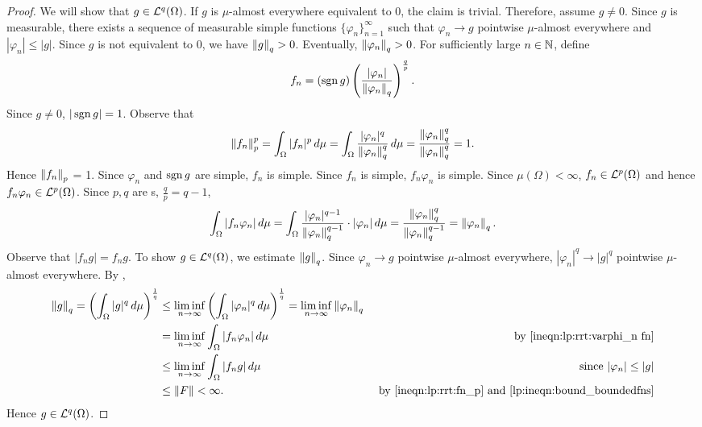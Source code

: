 \begin{proof}
We will show that $g \in {\mathcal {L}^q}(\Omega)$. If $g$ is $\mu$-almost everywhere equivalent to $0$, the claim is trivial. Therefore, assume $g \neq 0$. Since $g$ is measurable, there exists a sequence of measurable simple functions $\{ \varphi_n \}_{n = 1}^{\infty}$ such that $\varphi_n \rightarrow g$ pointwise $\mu$-almost everywhere and $| \varphi_n | \leq |g|$. Since $g$ is not equivalent to $0$, we have $\left\lVert g\right\rVert_q > 0$. Eventually, $\left\lVert \varphi_n\right\rVert_q > 0$. For sufficiently large $n \in {\mathbb N}$, define
\begin{align*}
    f_n = (\operatorname*{sgn} g) \left ( \frac{|\varphi_n|}{\left\lVert\varphi_n\right\rVert_q} \right)^{\frac{q}{p}}.
\end{align*}
Since $g \neq 0$, $| \operatorname*{sgn} g | = 1$. Observe that 
\begin{align}
     \label{ineqn:lp:rrt:fn_p}
    \left\lVert f_n\right\rVert_p^p = \int_\Omega |f_n|^p  \,d\mu = \int_\Omega \frac{|\varphi_n|^q}{\left\lVert\varphi_n\right\rVert_q^q} \,d\mu = \frac{\left\lVert\varphi_n\right\rVert_q^q}{\left\lVert\varphi_n\right\rVert_q^q} = 1.
\end{align}
Hence $\left\lVert f_n\right\rVert_p$ = 1. Since $\varphi_n$ and $\operatorname*{sgn} g$ are simple, $f_n$ is simple. Since $f_n$ is simple, $f_n \varphi_n$ is simple. Since $\mu(\Omega) < \infty$, $f_n \in {\mathcal {L}^p}(\Omega)$ and hence $f_n \varphi_n \in {\mathcal {L}^p}(\Omega)$.
Since $p, q$ are s, $\frac{q}{p} = q - 1$,
\begin{equation}
    \label{ineqn:lp:rrt:varphi_n fn}
    \int_\Omega | f_n \varphi_n | \,d\mu  = \int_\Omega \frac{|\varphi_n|^{q-1}}{\left\lVert\varphi_n\right\rVert_q^{q - 1}} \cdot |\varphi_n | \,d\mu = \frac{\left\lVert\varphi_n\right\rVert_q^{q}}{\left\lVert\varphi_n\right\rVert_q^{q - 1}} = \left\lVert\varphi_n\right\rVert_q. 
\end{equation}
Observe that $|f_n g| = f_n g$.
To show $g \in {\mathcal {L}^q}(\Omega)$, we estimate $\left\lVert g\right\rVert_q$. Since $\varphi_n \rightarrow g$ pointwise $\mu$-almost everywhere, $|\varphi_n|^q \rightarrow |g|^q$ pointwise $\mu$-almost everywhere. By ,
\begin{align*}
    \left\lVert g\right\rVert_q= \left ( \int_\Omega |g|^q \,d\mu \right)^{\frac{1}{q}} &\leq \liminf_{n \to \infty}  \left ( \int_\Omega |\varphi_n|^q  \,d\mu \right ) ^{\frac{1}{q}} = \liminf_{n \to \infty} \left\lVert\varphi_n\right\rVert_q \\
                 &= \liminf_{n \to \infty} \int_\Omega | f_n \varphi_n | \,d\mu & \text{by \ref{ineqn:lp:rrt:varphi_n fn}} \\
                 &\leq \liminf_{n \to \infty} \int_\Omega | f_n g | \,d\mu  & \text{since $|\varphi_n| \leq |g|$}\\
                 &\leq \left\lVert F\right\rVert < \infty. & \text{ by \ref{ineqn:lp:rrt:fn_p} and \ref{lp:ineqn:bound_boundedfns}}
\end{align*}
Hence $g \in {\mathcal {L}^q}(\Omega)$.


\end{proof}

